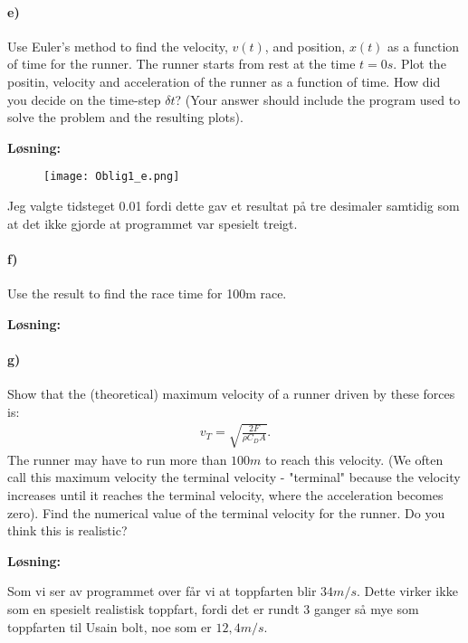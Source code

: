 \documentclass[11pt, A4paper,norsk]{article}
\begin{document}
		\paragraph{e)}
			\begin{flushleft}
Use Euler's method to find the velocity, $v(t)$, and position, $x(t)$ as a function of time for the runner. The runner starts from rest at the time $t = 0s$. Plot the positin, velocity and acceleration of the runner as a function of time. How did you decide on the time-step $\delta t$? (Your answer should include the program used to solve the problem and the resulting plots).
			\end{flushleft}
			\begin{flushleft}
\textbf{Løsning:}
			\end{flushleft}

			\begin{figure}[H]
\texttt{[image: Oblig1\_e.png]}
			\end{figure}
Jeg valgte tidsteget 0.01 fordi dette gav et resultat på tre desimaler samtidig som at det ikke gjorde at programmet var spesielt treigt.
		\paragraph{f)}
			\begin{flushleft}
Use the result to find the race time for 100m race.
			\end{flushleft}
			\begin{flushleft}
\textbf{Løsning:}
			\end{flushleft}
				\begin{flushleft}

				\end{flushleft}
		\paragraph{g)}
			\begin{flushleft}
Show that the (theoretical) maximum velocity of a runner driven by these forces is:
				\begin{align}
v_{T} = \sqrt{\frac{2F}{\rho C_{D} A}}.
				\end{align}
The runner may have to run more than $100m$ to reach this velocity. (We often call this maximum velocity the terminal velocity - "terminal" because the velocity increases until it reaches the terminal velocity, where the acceleration becomes zero). Find the numerical value of the terminal velocity for the runner. Do you think this is realistic?
			\end{flushleft}
			\begin{flushleft}
\textbf{Løsning:}
			\end{flushleft}
				\begin{flushleft}

Som vi ser av programmet over får vi at toppfarten blir $34m/s$. Dette virker ikke som en spesielt realistisk toppfart, fordi det er rundt 3 ganger så mye som toppfarten til Usain bolt, noe som er $12,4m/s$.
				\end{flushleft}
\end{document}
